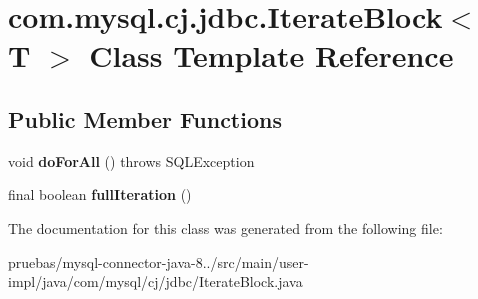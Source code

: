 \hypertarget{classcom_1_1mysql_1_1cj_1_1jdbc_1_1_iterate_block}{}\section{com.\+mysql.\+cj.\+jdbc.\+Iterate\+Block$<$ T $>$ Class Template Reference}
\label{classcom_1_1mysql_1_1cj_1_1jdbc_1_1_iterate_block}
\subsection*{Public Member Functions}
\begin{DoxyCompactItemize}
\item 
\mbox{\label{classcom_1_1mysql_1_1cj_1_1jdbc_1_1_iterate_block_a548a66ba2491af3b82c27b9120b30476}} 
void {\bfseries do\+For\+All} ()  throws S\+Q\+L\+Exception 
\item 
\mbox{\label{classcom_1_1mysql_1_1cj_1_1jdbc_1_1_iterate_block_a5969692e9d396a55847ad80abd25bfc3}} 
final boolean {\bfseries full\+Iteration} ()
\end{DoxyCompactItemize}


The documentation for this class was generated from the following file\+:\begin{DoxyCompactItemize}
\item 
pruebas/mysql-\/connector-\/java-\/8../src/main/user-\/impl/java/com/mysql/cj/jdbc/Iterate\+Block.\+java\end{DoxyCompactItemize}
